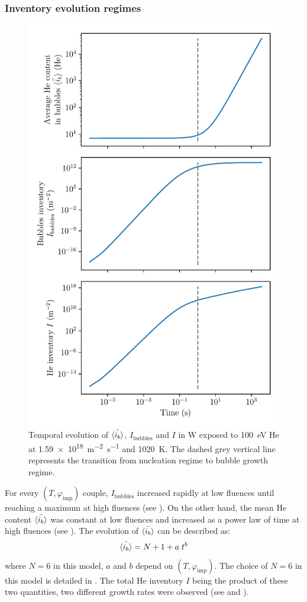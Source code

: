 \subsubsection{Inventory evolution regimes} 

\begin{figure} [h]
    \centering
    \includegraphics[width=0.75\linewidth]{Figures/Chapter4/parametric study/inventory_bubbles_ib.pdf}
    \caption{Temporal evolution of $\Bar{\langle i_b \rangle}$, $I_\mathrm{bubbles}$ and $I$ in W exposed to \SI{100}{eV} He at \SI{1.59e18}{m^{-2}.s^{-1}} and \SI{1020}{K}. The dashed grey vertical line represents the transition from nucleation regime to bubble growth regime.}
\end{figure}

For every $(T, \varphi_\mathrm{imp})$ couple, $I_\mathrm{bubbles}$ increased rapidly at low \glspl{fluence} until reaching a maximum at high \glspl{fluence} (see ).
On the other hand, the mean \gls{He} content $\Bar{\langle i_b \rangle}$ was constant at low \glspl{fluence} and increased as a power law of time at high \glspl{fluence} (see ).
The evolution of $\Bar{\langle i_b \rangle}$ can be described as:
\begin{equation}
    \Bar{\langle i_b \rangle} = N + 1 + a \; t^b
    \labeq{ib evolution}
\end{equation}
where $N=6$ in this model, $a$ and $b$ depend on $(T, \varphi_\mathrm{imp})$.
The choice of $N=6$ in this model is detailed in .
The total \gls{He} \gls{inventory} $I$ being the product of these two quantities, two different growth rates were observed (see  and ).


